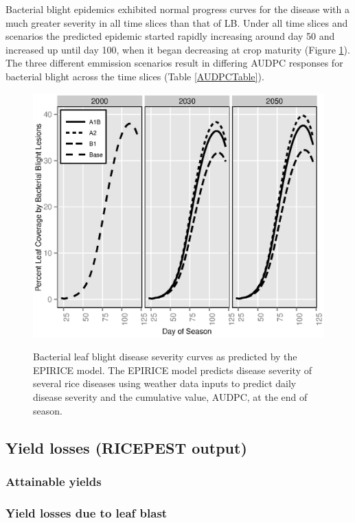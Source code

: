 \documentclass[preprint,12pt]{elsarticle}
\begin{document}
Bacterial blight epidemics exhibited normal progress curves for the disease with a much greater severity in all time slices than that of LB. Under all time slices and scenarios the predicted epidemic started rapidly increasing around day 50 and increased up until day 100, when it began decreasing at crop maturity (Figure \ref{BBCurves}). The three different emmission scenarios result in differing AUDPC responses for bacterial blight across the time slices (Table \ref{AUDPCTable}).

\begin{figure}[H]
  \includegraphics[width = 140mm]{figures/BB}
  \label{BBCurves}
  \caption{Bacterial leaf blight disease severity curves as predicted by the EPIRICE model. The EPIRICE model predicts disease severity of several rice diseases using weather data inputs to predict daily disease severity and the cumulative value, AUDPC, at the end of season.}
\end{figure}

\subsection{Yield losses (RICEPEST output)}
\subsubsection{Attainable yields}

\subsubsection{Yield losses due to leaf blast}
\end{document}
